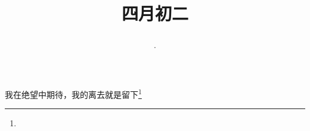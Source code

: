 \title{\date[d=9,m=5,y=2024][year:cn-y,年,month:cn,day:cn,日,·,weekday]·四月初二 }
我在绝望中期待，我的离去就是留下\footnote{ }

